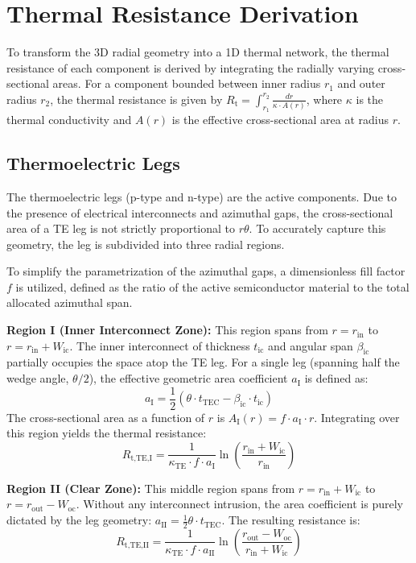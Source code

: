 \documentclass[conference,a4paper]{IEEEtran}
\begin{document}
\section{Thermal Resistance Derivation}

To transform the 3D radial geometry into a 1D thermal network, the thermal resistance of each component is derived by integrating the radially varying cross-sectional areas. For a component bounded between inner radius $r_1$ and outer radius $r_2$, the thermal resistance is given by $R_{\text{t}} = \int_{r_1}^{r_2} \frac{dr}{\kappa \cdot A(r)}$, where $\kappa$ is the thermal conductivity and $A(r)$ is the effective cross-sectional area at radius $r$.

\subsection{Thermoelectric Legs}
The thermoelectric legs (p-type and n-type) are the active components. Due to the presence of electrical interconnects and azimuthal gaps, the cross-sectional area of a TE leg is not strictly proportional to $r \theta$. To accurately capture this geometry, the leg is subdivided into three radial regions.

To simplify the parametrization of the azimuthal gaps, a dimensionless fill factor $f$ is utilized, defined as the ratio of the active semiconductor material to the total allocated azimuthal span.

\textbf{Region I (Inner Interconnect Zone):} This region spans from $r=r_{\text{in}}$ to $r=r_{\text{in}}+W_{\text{ic}}$. The inner interconnect of thickness $t_{\text{ic}}$ and angular span $\beta_{\text{ic}}$ partially occupies the space atop the TE leg. For a single leg (spanning half the wedge angle, $\theta/2$), the effective geometric area coefficient $a_{\text{I}}$ is defined as:
\begin{equation}
	a_{\text{I}} = \frac{1}{2}\left( \theta \cdot t_{\text{TEC}} - \beta_{\text{ic}} \cdot t_{\text{ic}} \right)
\end{equation}
The cross-sectional area as a function of $r$ is $A_{\text{I}}(r) = f \cdot a_{\text{I}} \cdot r$. Integrating over this region yields the thermal resistance:
\begin{equation}
	R_{\text{t,TE,I}} = \frac{1}{\kappa_{\text{TE}} \cdot f \cdot a_{\text{I}}} \ln \left( \frac{r_{\text{in}} + W_{\text{ic}}}{r_{\text{in}}} \right)
\end{equation}

\textbf{Region II (Clear Zone):} This middle region spans from $r=r_{\text{in}}+W_{\text{ic}}$ to $r=r_{\text{out}}-W_{\text{oc}}$. Without any interconnect intrusion, the area coefficient is purely dictated by the leg geometry: $a_{\text{II}} = \frac{1}{2} \theta \cdot t_{\text{TEC}}$. The resulting resistance is:
\begin{equation}
	R_{\text{t,TE,II}} = \frac{1}{\kappa_{\text{TE}} \cdot f \cdot a_{\text{II}}} \ln \left( \frac{r_{\text{out}} - W_{\text{oc}}}{r_{\text{in}} + W_{\text{ic}}} \right)
\end{equation}
\end{document}
